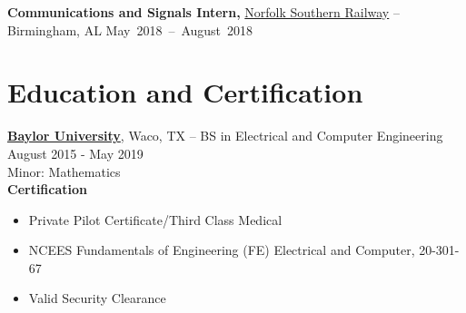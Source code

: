 \documentclass[11pt]{article}       %
\begin{document}
\textbf{Communications and Signals Intern,} \href{https://www.norfolksouthern.com/}{Norfolk Southern Railway} -- Birmingham, AL \mbox{\hfill May 2018 -- August 2018} \\



\vspace{-18.5pt}

\section*{Education and Certification}
\textbf{\href{https://www.baylor.edu/}{Baylor University}}, Waco, TX -- BS in Electrical and Computer Engineering \hfill August 2015 - May 2019 \\
Minor: Mathematics\\

\textbf{Certification}
\begin{itemize}
   \item Private Pilot Certificate/Third Class Medical
   \item NCEES Fundamentals of Engineering (FE) Electrical and Computer, 20-301-67
   \item Valid Security Clearance
\end{itemize}
\end{document}
